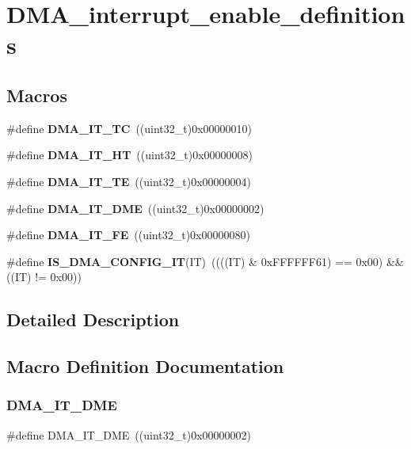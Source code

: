 \section{D\+M\+A\+\_\+interrupt\+\_\+enable\+\_\+definitions}
\label{group__DMA__interrupt__enable__definitions}
\subsection*{Macros}
\begin{DoxyCompactItemize}
\item 
\#define \textbf{ D\+M\+A\+\_\+\+I\+T\+\_\+\+TC}~((uint32\+\_\+t)0x00000010)
\item 
\#define \textbf{ D\+M\+A\+\_\+\+I\+T\+\_\+\+HT}~((uint32\+\_\+t)0x00000008)
\item 
\#define \textbf{ D\+M\+A\+\_\+\+I\+T\+\_\+\+TE}~((uint32\+\_\+t)0x00000004)
\item 
\#define \textbf{ D\+M\+A\+\_\+\+I\+T\+\_\+\+D\+ME}~((uint32\+\_\+t)0x00000002)
\item 
\#define \textbf{ D\+M\+A\+\_\+\+I\+T\+\_\+\+FE}~((uint32\+\_\+t)0x00000080)
\item 
\#define \textbf{ I\+S\+\_\+\+D\+M\+A\+\_\+\+C\+O\+N\+F\+I\+G\+\_\+\+IT}(IT)~((((IT) \& 0x\+F\+F\+F\+F\+F\+F61) == 0x00) \&\& ((\+I\+T) != 0x00))
\end{DoxyCompactItemize}


\subsection{Detailed Description}


\subsection{Macro Definition Documentation}
\mbox{\label{group__DMA__interrupt__enable__definitions_ga71137443f7bdced1ee80697596e9ea98}} 
\subsubsection{D\+M\+A\+\_\+\+I\+T\+\_\+\+D\+ME}
{\footnotesize\ttfamily \#define D\+M\+A\+\_\+\+I\+T\+\_\+\+D\+ME~((uint32\+\_\+t)0x00000002)}



